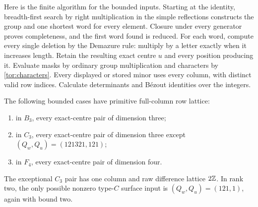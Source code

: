 Here is the finite algorithm for the bounded inputs. Starting at the identity, breadth-first search by right multiplication in the simple reflections constructs the group and one shortest word for every element. Closure under every generator proves completeness, and the first word found is reduced. For each word, compute every single deletion by the Demazure rule: multiply by a letter exactly when it increases length. Retain the resulting exact centre $u$ and every position producing it. Evaluate masks by ordinary group multiplication and characters by \eqref{tor:characters}. Every displayed or stored minor uses every column, with distinct valid row indices. Calculate determinants and B\'ezout identities over the integers.

\begin{proposition}\label{tor:certificates}
The following bounded cases have primitive full-column row lattice:
\begin{enumerate}
 \item in $B_3$, every exact-centre pair of dimension three;
 \item in $C_3$, every exact-centre pair of dimension three except $(Q_w,Q_u)=(121321,121)$;
 \item in $F_4$, every exact-centre pair of dimension four.
\end{enumerate}
The exceptional $C_3$ pair has one column and raw difference lattice $2\mathbb Z$. In rank two, the only possible nonzero type-$C$ surface input is $(Q_w,Q_u)=(121,1)$, again with bound two.
\end{proposition}
